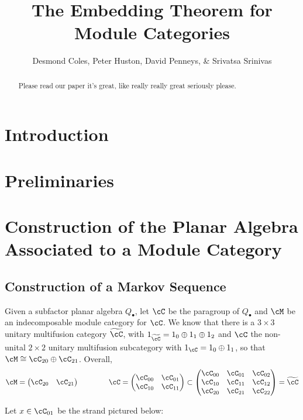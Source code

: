 \documentclass[11pt]{article}
\title{The Embedding Theorem for Module Categories}
\author{Desmond Coles, Peter Huston, David Penneys, \& Srivatsa Srinivas}
\theoremstyle{plain}
\theoremstyle{definition}
\begin{document}

\maketitle
\begin{abstract}
Please read our paper it's great, like really really great seriously please.
\end{abstract}
\section{Introduction}
\section{Preliminaries}
\section{Construction of the Planar Algebra Associated to a Module Category}
\subsection{Construction of a Markov Sequence}
Given a subfactor planar algebra $Q_{\bullet}$, let $\cC$ be the paragroup of $Q_{\bullet}$ and $\cM$ be an indecomposable module category for $\cC$. We know that there is a $3\times 3$ unitary multifusion category $\widetilde{\cC}$, with $1_{\widetilde{\cC}}= 1_0 \oplus 1_1 \oplus 1_2$ and $\cC$ the  non-unital $2\times 2$ unitary multifusion subcategory with $1_\cC = 1_0\oplus 1_1$, so that $\cM\cong\cC_{20}\oplus \cC_{21}$. Overall,
$$
\cM 
=
\begin{pmatrix}
\cC_{20} & \cC_{21} 
\end{pmatrix}
\qquad\qquad
\cC
=
\begin{pmatrix}
\cC_{00} & \cC_{01} 
\\
\cC_{10} & \cC_{11}
\end{pmatrix}
\subset
\begin{pmatrix}
\cC_{00} & \cC_{01} & \cC_{02}
\\
\cC_{10} & \cC_{11} & \cC_{12}
\\
\cC_{20} & \cC_{21} & \cC_{22}
\end{pmatrix}
=
\widetilde{\cC}
$$

Let $x\in \cC_{01}$ be the strand pictured below:
\end{document}

